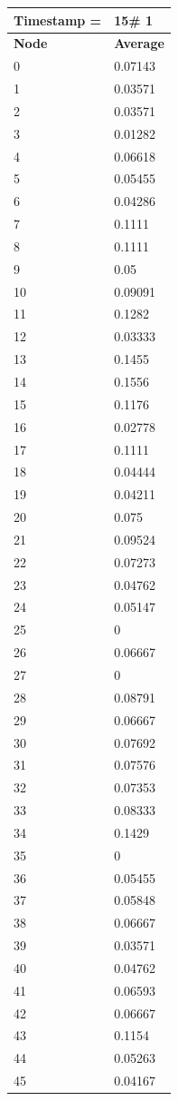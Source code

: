 \begin{tabular}{|l||l|}
\hline
\textbf{Timestamp =} & \textbf{15}\# 1\\\hline
	\textbf{Node} & \textbf{Average} \\ \hline
\hline
	0 & 0.07143 \\ \hline
	1 & 0.03571 \\ \hline
	2 & 0.03571 \\ \hline
	3 & 0.01282 \\ \hline
	4 & 0.06618 \\ \hline
	5 & 0.05455 \\ \hline
	6 & 0.04286 \\ \hline
	7 & 0.1111 \\ \hline
	8 & 0.1111 \\ \hline
	9 & 0.05 \\ \hline
	10 & 0.09091 \\ \hline
	11 & 0.1282 \\ \hline
	12 & 0.03333 \\ \hline
	13 & 0.1455 \\ \hline
	14 & 0.1556 \\ \hline
	15 & 0.1176 \\ \hline
	16 & 0.02778 \\ \hline
	17 & 0.1111 \\ \hline
	18 & 0.04444 \\ \hline
	19 & 0.04211 \\ \hline
	20 & 0.075 \\ \hline
	21 & 0.09524 \\ \hline
	22 & 0.07273 \\ \hline
	23 & 0.04762 \\ \hline
	24 & 0.05147 \\ \hline
	25 & 0 \\ \hline
	26 & 0.06667 \\ \hline
	27 & 0 \\ \hline
	28 & 0.08791 \\ \hline
	29 & 0.06667 \\ \hline
	30 & 0.07692 \\ \hline
	31 & 0.07576 \\ \hline
	32 & 0.07353 \\ \hline
	33 & 0.08333 \\ \hline
	34 & 0.1429 \\ \hline
	35 & 0 \\ \hline
	36 & 0.05455 \\ \hline
	37 & 0.05848 \\ \hline
	38 & 0.06667 \\ \hline
	39 & 0.03571 \\ \hline
	40 & 0.04762 \\ \hline
	41 & 0.06593 \\ \hline
	42 & 0.06667 \\ \hline
	43 & 0.1154 \\ \hline
	44 & 0.05263 \\ \hline
	45 & 0.04167 \\ \hline
\end{tabular}

